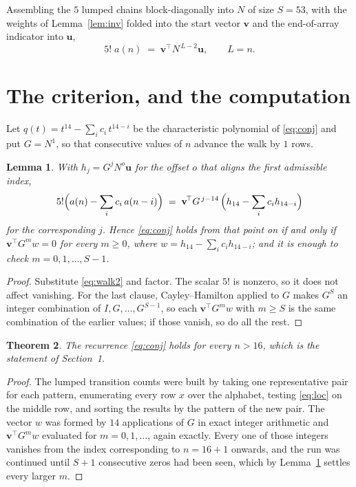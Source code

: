 \documentclass[11pt,a4paper]{article}
\theoremstyle{plain}
\newtheorem{theorem}{Theorem}
\newtheorem{lemma}[theorem]{Lemma}
\theoremstyle{definition}
\begin{document}
Assembling the $5$ lumped chains block-diagonally into $N$ of size $S=53$, with the
weights of Lemma~\ref{lem:inv} folded into the start vector $\mathbf{v}$ and the
end-of-array indicator into $\mathbf{u}$,
\begin{equation}\label{eq:walk2}
5!\;a(n)\;=\;\mathbf{v}^{\!\top}N^{\,L-2}\mathbf{u},\qquad L=n .
\end{equation}

\section{The criterion, and the computation}

Let $q(t)=t^{14}-\sum_i c_i\,t^{14-i}$ be the characteristic polynomial of
\eqref{eq:conj} and put $G=N^{1}$, so that consecutive values of $n$ advance the
walk by $1$ rows.

\begin{lemma}\label{lem:crit}
With $h_j=G^{j}N^{o}\mathbf{u}$ for the offset $o$ that aligns the first admissible
index,
\[
5!\Bigl(a(n)-\sum_i c_i\,a(n-i)\Bigr)\;=\;\mathbf{v}^{\!\top}G^{\,j-14}\,
\Bigl(h_{14}-\sum_i c_i h_{14-i}\Bigr)
\]
for the corresponding $j$. Hence \eqref{eq:conj} holds from that point on if and only if
$\mathbf{v}^{\!\top}G^{m}w=0$ for every $m\ge0$, where
$w=h_{14}-\sum_i c_ih_{14-i}$; and it is enough to check $m=0,1,\dots,S-1$.
\end{lemma}

\begin{proof}
Substitute \eqref{eq:walk2} and factor. The scalar $5!$ is nonzero, so it does not
affect vanishing. For the last clause, Cayley--Hamilton applied to $G$ makes $G^{S}$ an
integer combination of $I,G,\dots,G^{S-1}$, so each $\mathbf{v}^{\!\top}G^{m}w$ with
$m\ge S$ is the same combination of the earlier values; if those vanish, so do all the rest.
\end{proof}

\begin{theorem}
The recurrence \eqref{eq:conj} holds for every $n>16$, which is the statement of
Section~1.
\end{theorem}

\begin{proof}
The lumped transition counts were built by taking one representative pair for each pattern,
enumerating every row $x$ over the alphabet, testing \eqref{eq:loc} on the middle
row, and sorting the results by the pattern of the new pair. The vector $w$ was formed by
$14$ applications of $G$ in exact integer arithmetic and $\mathbf{v}^{\!\top}G^{m}w$
evaluated for $m=0,1,\dots$, again exactly. Every one of those integers vanishes from the
index corresponding to $n=16+1$ onwards, and the run was continued until $S+1$
consecutive zeros had been seen, which by Lemma~\ref{lem:crit} settles every larger $m$.
\end{proof}
\end{document}

